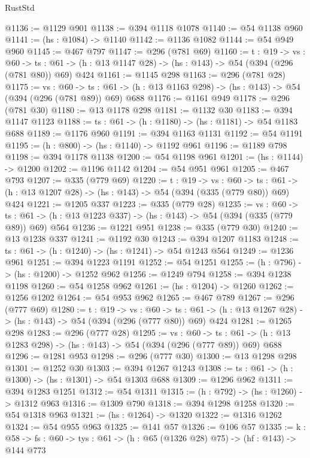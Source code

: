 \begin{lexlean}{RustStd}
\begin{coremodule}
{\begin{coremodule}
{{{{{{{{@1136 := @1129 @901
@1138 := @394 @1118 @1078
@1140 := @54 @1138 @960
@1141 := (hs : @1084) -> @1140
@1142 := @1136 @1082
@1144 := @54 @949 @960
@1145 := @467 @797
@1147 := @296 (@781 @69)
@1160 := {t : @19} ->
  {vs : @60} ->
  {ts : @61} -> (h : @13 @1147 @28) -> (hs : @143) -> @54 (@394 (@296 (@781 @80)) @69) @424
@1161 := @1145 @298
@1163 := @296 (@781 @28)
@1175 := {vs : @60} ->
  {ts : @61} -> (h : @13 @1163 @298) -> (hs : @143) -> @54 (@394 (@296 (@781 @89)) @69) @688
@1176 := @1161 @949
@1178 := @296 (@781 @30)
@1180 := @13 @1178 @298
@1181 := @1132 @30
@1183 := @394 @1147 @1123
@1188 := {ts : @61} -> (h : @1180) -> (hs : @1181) -> @54 @1183 @688
@1189 := @1176 @960
@1191 := @394 @1163 @1131
@1192 := @54 @1191
@1195 := (h : @800) -> (hs : @1140) -> @1192 @961
@1196 := @1189 @798
@1198 := @394 @1178 @1138
@1200 := @54 @1198 @961
@1201 := (hs : @1144) -> @1200
@1202 := @1196 @1142
@1204 := @54 @951 @961
@1205 := @467 @793
@1207 := @335 (@779 @69)
@1220 := {t : @19} ->
  {vs : @60} ->
  {ts : @61} -> (h : @13 @1207 @28) -> (hs : @143) -> @54 (@394 (@335 (@779 @80)) @69) @424
@1221 := @1205 @337
@1223 := @335 (@779 @28)
@1235 := {vs : @60} ->
  {ts : @61} -> (h : @13 @1223 @337) -> (hs : @143) -> @54 (@394 (@335 (@779 @89)) @69) @564
@1236 := @1221 @951
@1238 := @335 (@779 @30)
@1240 := @13 @1238 @337
@1241 := @1192 @30
@1243 := @394 @1207 @1183
@1248 := {ts : @61} -> (h : @1240) -> (hs : @1241) -> @54 @1243 @564
@1249 := @1236 @961
@1251 := @394 @1223 @1191
@1252 := @54 @1251
@1255 := (h : @796) -> (hs : @1200) -> @1252 @962
@1256 := @1249 @794
@1258 := @394 @1238 @1198
@1260 := @54 @1258 @962
@1261 := (hs : @1204) -> @1260
@1262 := @1256 @1202
@1264 := @54 @953 @962
@1265 := @467 @789
@1267 := @296 (@777 @69)
@1280 := {t : @19} ->
  {vs : @60} ->
  {ts : @61} -> (h : @13 @1267 @28) -> (hs : @143) -> @54 (@394 (@296 (@777 @80)) @69) @424
@1281 := @1265 @298
@1283 := @296 (@777 @28)
@1295 := {vs : @60} ->
  {ts : @61} -> (h : @13 @1283 @298) -> (hs : @143) -> @54 (@394 (@296 (@777 @89)) @69) @688
@1296 := @1281 @953
@1298 := @296 (@777 @30)
@1300 := @13 @1298 @298
@1301 := @1252 @30
@1303 := @394 @1267 @1243
@1308 := {ts : @61} -> (h : @1300) -> (hs : @1301) -> @54 @1303 @688
@1309 := @1296 @962
@1311 := @394 @1283 @1251
@1312 := @54 @1311
@1315 := (h : @792) -> (hs : @1260) -> @1312 @963
@1316 := @1309 @790
@1318 := @394 @1298 @1258
@1320 := @54 @1318 @963
@1321 := (hs : @1264) -> @1320
@1322 := @1316 @1262
@1324 := @54 @955 @963
@1325 := @141 @57
@1326 := @106 @57
@1335 := {k : @58} ->
  {fs : @60} -> {tys : @61} -> (h : @65 (@1326 @28) @75) -> (hf : @143) -> @144 @773
}}}}}}}}
\end{coremodule}}
\end{coremodule}
\end{lexlean}
